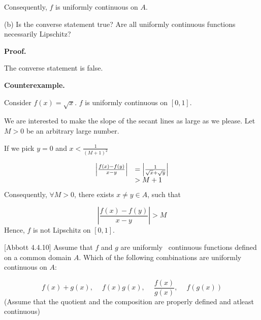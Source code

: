\documentclass[10pt]{article}
\begin{document}
Consequently, $\displaystyle f$ is uniformly continuous on $\displaystyle A$.



(b) Is the converse statement true? Are all uniformly continuous functions necessarily Lipschitz?



\textbf{Proof.}



The converse statement is false.



\textbf{Counterexample.}



Consider $\displaystyle f( x) =\sqrt{x}$. $\displaystyle f$ is uniformly continuous on $\displaystyle [ 0,1]$. 



We are interested to make the slope of the secant lines as large as we please. Let $\displaystyle M >0$ be an arbitrary large number.



If we pick $\displaystyle y=0$ and $\displaystyle x< \frac{1}{( M+1)^{2}}$


\begin{equation*}
\begin{array}{ c l }
\left| \frac{f( x) -f( y)}{x-y}\right|  & =\left| \frac{1}{\sqrt{x} +\sqrt{y}}\right| \\
 &  >M+1
\end{array}
\end{equation*}
Consequently, $\displaystyle \forall M >0$, there exists $\displaystyle x\neq y\in A$, such that 


\begin{equation*}
\left| \frac{f( x) -f( y)}{x-y}\right|  >M
\end{equation*}
Hence, $\displaystyle f$ is not Lipschitz on $\displaystyle [ 0,1]$.



[Abbott 4.4.10] Assume that $\displaystyle f$ and $\displaystyle g$ are uniformly \ continuous functions defined on a common domain $\displaystyle A$. Which of the following combinations are uniformly continuous on $\displaystyle A$:




\begin{equation*}
f( x) +g( x) ,\ \quad f( x) g( x) ,\quad \ \frac{f( x)}{g( x)} ,\quad \ f( g( x))
\end{equation*}
(Assume that the quotient and the composition are properly defined and atleast continuous)
\end{document}
